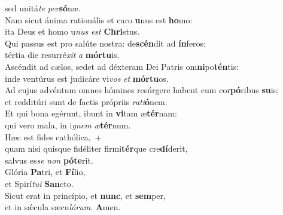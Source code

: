 \evenverse sed unitá\textit{te} \textit{per}\textbf{só}næ.\\
\oddverse Nam sicut ánima rationális et caro \textbf{u}nus est \textbf{ho}mo:~\*\\
\oddverse ita Deus et homo u\textit{nus} \textit{est} \textbf{Chri}stus.\\
\evenverse Qui passus est pro salúte nostra: de\textbf{scén}dit ad \textbf{ín}feros:~\*\\
\evenverse tértia die resurré\textit{xit} \textit{a} \textbf{mór}\textbf{tu}is.\\
\oddverse Ascéndit ad cælos, sedet ad déxteram Dei Patris om\textbf{ni}po\textbf{tén}tis:~\*\\
\oddverse inde ventúrus est judicáre vi\textit{vos} \textit{et} \textbf{mór}\textbf{tu}os.\\
\evenverse Ad cujus advéntum omnes hómines resúrgere habent cum cor\textbf{pó}ribus \textbf{su}is;~\*\\
\evenverse et redditúri sunt de factis própriis \textit{ra}\textit{ti}\textbf{ó}nem.\\
\oddverse Et qui bona egérunt, ibunt in \textbf{vi}tam æ\textbf{tér}nam:~\*\\
\oddverse qui vero mala, in i\textit{gnem} \textit{æ}\textbf{tér}num.\\
\evenverse Hæc est fides cathólica,~+\\
\evenverse  quam nisi quisque fidéliter firmi\textbf{tér}que cre\textbf{dí}derit,~\*\\
\evenverse salvus es\textit{se} \textit{non} \textbf{pó}\textbf{te}rit.\\
\oddverse Glória \textbf{Pa}tri, et \textbf{Fí}lio,~\*\\
\oddverse et Spirí\textit{tu}\textit{i} \textbf{San}cto.\\
\evenverse Sicut erat in princípio, et \textbf{nunc}, et \textbf{sem}per,~\*\\
\evenverse et in sǽcula sæcu\textit{ló}\textit{rum}. \textbf{A}men.\\
